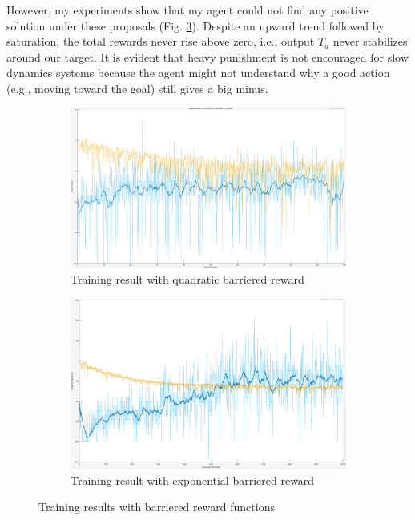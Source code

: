 \documentclass[../main.tex]{subfiles}
\begin{document}
However, my experiments show that my agent could not find any positive solution under these proposals (Fig. \ref{fig:bar_rwd}). Despite an upward trend followed by saturation, the total rewards never rise above zero, i.e., output $T_a$ never stabilizes around our target. It is evident that heavy punishment is not encouraged for slow dynamics systems because the agent might not understand why a good action (e.g., moving toward the goal) still gives a big minus.
\begin{figure}[htbp]
\centering
\begin{subfigure}{\textwidth}
    \includegraphics[width=\linewidth]{figures/quadbar_rwd.png}
    \caption{Training result with quadratic barriered reward}
    \label{fig:quadbar_rwd}
\end{subfigure}
\begin{subfigure}{\textwidth}
    \includegraphics[width=\linewidth]{figures/expbar_rwd.png}
    \caption{Training result with exponential barriered reward}
    \label{fig:expbar_rwd}
\end{subfigure}
\caption{Training results with barriered reward functions}
\label{fig:bar_rwd}
\end{figure}
\end{document}
